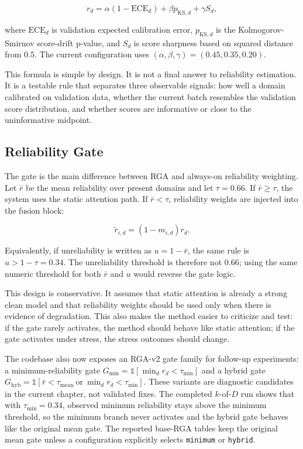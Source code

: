 \documentclass[11pt]{article}
\newcommand{\method}{RGA}
\begin{document}
\begin{equation}
  r_d =
  \alpha(1-\mathrm{ECE}_d)
  + \beta p_{\mathrm{KS},d}
  + \gamma S_d,
  \label{eq:thesis-reliability}
\end{equation}

where $\mathrm{ECE}_d$ is validation expected calibration error,
$p_{\mathrm{KS},d}$ is the Kolmogorov-Smirnov score-drift p-value, and $S_d$ is
score sharpness based on squared distance from $0.5$. The current configuration
uses $(\alpha,\beta,\gamma)=(0.45,0.35,0.20)$.

This formula is simple by design. It is not a final answer to reliability
estimation. It is a testable rule that separates three observable signals: how
well a domain calibrated on validation data, whether the current batch resembles
the validation score distribution, and whether scores are informative or close
to the uninformative midpoint.

\subsection{Reliability Gate}

The gate is the main difference between \method{} and always-on reliability
weighting. Let $\bar{r}$ be the mean reliability over present domains and let
$\tau=0.66$. If $\bar{r}\geq\tau$, the system uses the static attention path. If
$\bar{r}<\tau$, reliability weights are injected into the fusion block:

\begin{equation}
  \tilde{r}_{i,d} = (1-m_{i,d})r_d.
\end{equation}

Equivalently, if unreliability is written as $u=1-\bar r$, the same rule is
$u>1-\tau=0.34$. The unreliability threshold is therefore not $0.66$; using the
same numeric threshold for both $\bar r$ and $u$ would reverse the gate logic.

This design is conservative. It assumes that static attention is already a
strong clean model and that reliability weights should be used only when there
is evidence of degradation. This also makes the method easier to criticize and
test: if the gate rarely activates, the method should behave like static
attention; if the gate activates under stress, the stress outcomes should
change.

The codebase also now exposes an \method{}-v2 gate family for follow-up
experiments: a minimum-reliability gate
$G_{\min}=\mathbb{1}[\min_d r_d<\tau_{\min}]$ and a hybrid gate
$G_{\mathrm{hyb}}=\mathbb{1}[\bar r<\tau_{\mathrm{mean}}\ \mathrm{or}\
\min_d r_d<\tau_{\min}]$. These variants are diagnostic candidates in the
current chapter, not validated fixes. The completed $k$-of-$D$ run shows that
with $\tau_{\min}=0.34$, observed minimum reliability stays above the minimum
threshold, so the minimum branch never activates and the hybrid gate behaves
like the original mean gate. The reported base-\method{} tables keep the
original mean gate unless a configuration explicitly selects
\texttt{minimum} or \texttt{hybrid}.
\end{document}
